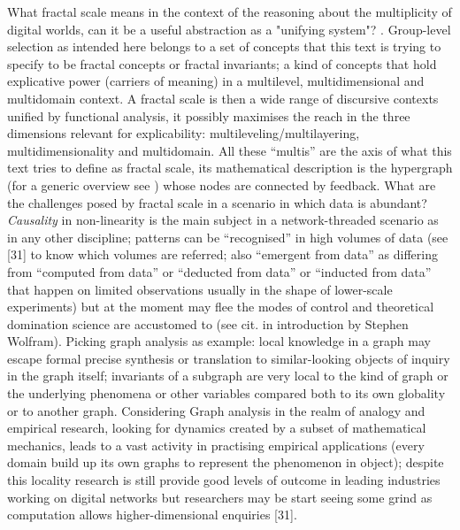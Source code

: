 \documentclass[14pt,a4paper]{extarticle}
\begin{document}
\hspace*{15mm}What fractal scale means in the context of the reasoning about the multiplicity of digital worlds, can it be a useful abstraction as a "unifying system"?  \cite{SLOANdarwin}. Group-level selection as intended here belongs to a set of concepts that this text is trying to specify to be fractal concepts or fractal invariants; a kind of concepts that hold explicative power (carriers of meaning) in a multilevel, multidimensional and multidomain context. A fractal scale is then a wide range of discursive contexts unified by functional analysis, it possibly maximises the reach in the three dimensions relevant for explicability: multileveling/multilayering, multidimensionality and multidomain. All these “multis” are the axis of what this text tries to define as fractal scale, its mathematical description is the hypergraph (for a generic overview see \cite{QuantaGraphs}) whose nodes are connected by feedback.
\newline
What are the challenges posed by fractal scale in a scenario in which data is abundant?
\newline
\hspace*{15mm}\textit{Causality} in non-linearity is the main subject in a network-threaded scenario as in any other discipline; patterns can be “recognised” in high volumes of data (see [31] to know which volumes are referred; also “emergent from data” as differing from “computed from data” or “deducted from data” or “inducted from data” that happen on limited observations usually in the shape of lower-scale experiments) but at the moment may flee the modes of control and theoretical domination science are accustomed to (see cit. in introduction by Stephen Wolfram).
\newline
Picking graph analysis as example: local knowledge in a graph may escape formal precise synthesis or translation to similar-looking objects of inquiry in the graph itself; invariants of a subgraph are very local to the kind of graph or the underlying phenomena or other variables compared both to its own globality or to another graph. Considering Graph analysis in the realm of analogy and empirical research, looking for dynamics created by a subset of mathematical mechanics, leads to a vast activity in practising empirical applications (every domain build up its own graphs to represent the phenomenon in object); despite this locality research is still provide good levels of outcome in leading industries working on digital networks but researchers may be start seeing some grind as computation allows higher-dimensional enquiries [31].
\end{document}
